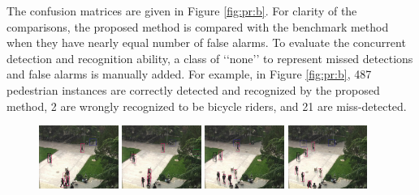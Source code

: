 \documentclass[10pt,twocolumn,letterpaper]{article}
\begin{document}
The confusion matrices are given in Figure \ref{fig:pr:b}. For clarity of the comparisons, the proposed method is compared with the benchmark method when they have nearly equal number of false alarms. To evaluate the concurrent detection and recognition ability, a class of {\lq\lq}none{\rq\rq} to represent missed detections and false alarms is manually added. For example, in Figure \ref{fig:pr:b}, 487 pedestrian instances are correctly detected and recognized by the proposed method, 2 are wrongly recognized to be bicycle riders, and 21 are miss-detected.

\begin{figure}
\centering
\includegraphics[width=0.23\textwidth,bb=0 0 720 576]{016.jpg}
\includegraphics[width=0.23\textwidth,bb=0 0 720 576]{026.jpg}
\includegraphics[width=0.23\textwidth,bb=0 0 720 576]{071.jpg}
\includegraphics[width=0.23\textwidth,bb=0 0 720 576]{116.jpg}



\end{figure}
\end{document}
